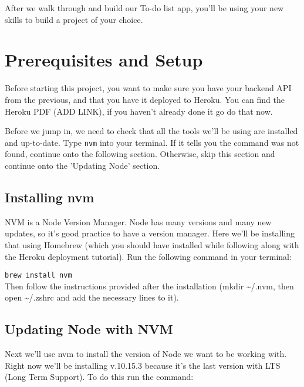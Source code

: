 \documentclass{42-en}
\begin{document}
After we walk through and build our To-do list app, you'll be using your new skills to build a project of your choice.

\chapter{Prerequisites and Setup}

Before starting this project, you want to make sure you have your backend API from the previous, and that you have it deployed to Heroku. You can find the Heroku PDF (ADD LINK), if you haven’t already done it go do that now.

Before we jump in, we need to check that all the tools we’ll be using are installed and up-to-date. Type \texttt{nvm} into your terminal. If it tells you the command was not found, continue onto the following section. Otherwise, skip this section and continue onto the 'Updating Node’ section.
\section{Installing nvm}
NVM is a Node Version Manager. Node has many versions and many new updates, so it’s good practice to have a version manager. Here we’ll be installing that using Homebrew (which you should have installed while following along with the Heroku deployment tutorial). Run the following command in your terminal:

\texttt{brew install nvm}\\
\newline
Then follow the instructions provided after the installation (mkdir \textasciitilde/.nvm, then open \textasciitilde/.zshrc and add the necessary lines to it).
\section{Updating Node with NVM}
Next we’ll use nvm to install the version of Node we want to be working with. Right now we’ll be installing v.10.15.3 because it’s the last version with LTS (Long Term Support). To do this run the command:
\end{document}
